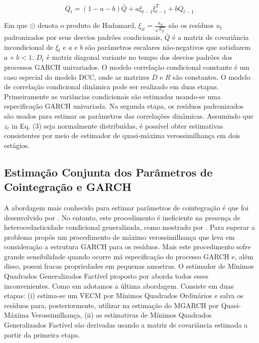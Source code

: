    \begin{equation}
   Q_{t}=(1-a-b) \bar{Q} + a \xi_{t-1} \xi_{t-1}^T+bQ_{t-1}
   \end{equation}
   
 Em que $\odot$ denota o produto de Hadamard, $\xi_{it} =  \frac{u_{it}}{\sqrt{h_{it}}}$  são os resíduos $u_t$ padronizados  por seus desvios padrões condicionais, $\bar{Q}$ é a matriz de covariância incondicional de $\xi_{t}$ e $a$ e $b$ são parâmetros escalares não-negativos que satisfazem $a + b<1$. $D_t$ é matriz diagonal variante no tempo dos desvios padrões dos processos GARCH univariados. O modelo correlação condicional constante é um caso especial do modelo DCC, onde as matrizes $D$ e $R$ são constantes.
 O modelo de correlação condicional dinâmica pode ser realizado em duas etapas. Primeiramente as variâncias condicionais são estimadas usando-se uma especificação GARCH univariada. Na segunda etapa, os resíduos padronizados são usados para estimar os parâmetros das correlações dinâmicas.
 Assumindo que $z_t$ in Eq. (3) seja normalmente distribuídas, é possível obter estimativas consistentes por meio de estimador de quasi-máxima verossimilhança em dois estágios.  
 	
 \subsection{Estimação Conjunta dos Parâmetros de Cointegração e GARCH} 
 

	A abordagem mais conhecido para estimar parâmetros de cointegração é que foi desenvolvido por . No entanto, este procedimento é ineficiente na presença de heterocedasticidade condicional generalizada, como mostrado por . Para superar a problema  propôs um procedimento de máximo verossimilhança que leva em consideração a estrutura GARCH para os resíduos. Mais este procedimento sofre grande sensibilidade quando ocorre má especificação do  processo GARCH e, além disso, possui fracas propriedades em pequenas amostras.  O estimador de Mínimos Quadrados Generalizados Factível proposto por  aborda todos esses inconvenientes. Como em   adotamos a última abordagem. Consiste em duas etapas: (i) estima-se um VECM por Mínimos Quadrados Ordinários e salva os resíduos  para,  posteriormente, utilizar na estimação do MGARCH por Quasi-Máxima Verossimilhança, (ii) as estimativas de Mínimos Quadrados Generalizados Factível são derivadas usando a matriz de covariância estimada a partir da primeira etapa.
	
